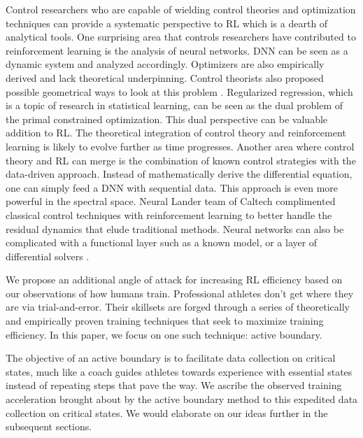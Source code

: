 \documentclass[journal]{IEEEtran}
\begin{document}
Control researchers who are capable of wielding control theories and optimization techniques can provide a systematic perspective to RL which is a dearth of analytical tools. One surprising area that controls researchers have contributed to reinforcement learning is the analysis of neural networks. DNN can be seen as a dynamic system and analyzed accordingly\cite{Weinan2017APO}\cite{Dupont2019AugmentedNO}. Optimizers are also empirically derived and lack theoretical underpinning. Control theorists also proposed possible geometrical ways to look at this problem \cite{Betancourt2018OnSO}. Regularized regression, which is a topic of research in statistical learning, can be seen as the dual problem of the primal constrained optimization. This dual perspective can be valuable addition to RL\cite{Nachum2020ReinforcementLV}\cite{Luo2019ADR}. The theoretical integration of control theory and reinforcement learning is likely to evolve further as time progresses. Another area where control theory and RL can merge is the combination of known control strategies with the data-driven approach. Instead of mathematically derive the differential equation, one can simply feed a DNN with sequential data\cite{Wu2020DataDrivenDL}. This approach is even more powerful in the spectral space\cite{Li2020FourierNO}. Neural Lander team of Caltech \cite{Shi2019NeuralLS} complimented classical control techniques with reinforcement learning to better handle the residual dynamics that elude traditional methods. Neural networks can also be complicated with a functional layer such as a known model\cite{Hewing2020LearningBasedMP}\cite{Mohan2020EmbeddingHP}\cite{Lusch2018DeepLF}, or a layer of differential solvers \cite{Bai2019DeepEM}\cite{BelbutePeres2020CombiningDP}. 

We propose an additional angle of attack for increasing RL efficiency based on our observations of how humans train. Professional athletes don't get where they are via trial-and-error. Their skillsets are forged through a series of theoretically and empirically proven training techniques that seek to maximize training efficiency. In this paper, we focus on one such technique: active boundary.

The objective of an active boundary is to facilitate data collection on critical states, much like a coach guides athletes towards experience with essential states instead of repeating steps that pave the way. We ascribe the observed training acceleration brought about by the active boundary method to this expedited data collection on critical states. We would elaborate on our ideas further in the subsequent sections.
\end{document}
